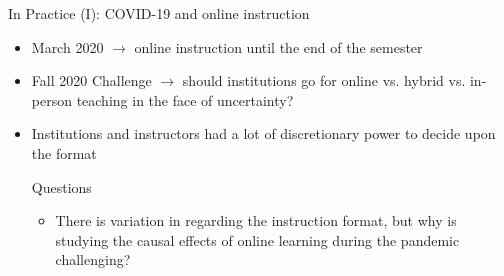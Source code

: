 \documentclass[notes,10pt, aspectratio=169]{beamer}
\begin{document}
\begin{frame}{In Practice (I): COVID-19 and online instruction}
\begin{itemize}
    \item March 2020 $\rightarrow$ online instruction until the end of the semester
    \item Fall 2020 Challenge  $\rightarrow$ should institutions go for online vs. hybrid vs. in-person teaching in the face of uncertainty?
    \item Institutions and instructors had a lot of discretionary power to decide upon the format
\begin{exampleblock}{Questions}
    \begin{itemize}
        \item There is variation in regarding the instruction format, but why is studying the causal effects of online learning during the pandemic challenging?
    \end{itemize}
\end{exampleblock}

\end{itemize}
\end{frame}
\end{document}
